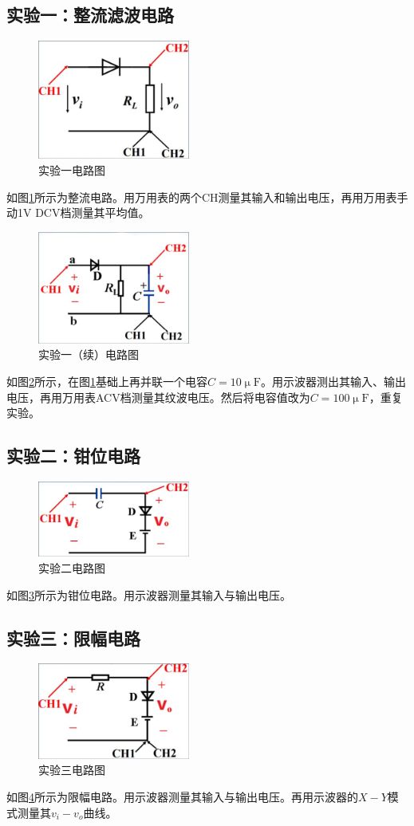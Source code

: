 \documentclass[a4paper,11pt,UTF8]{ctexart}
\begin{document}
	\subsection{实验一：整流滤波电路}
	\begin{figure}[H]
		\centering
		\includegraphics[width=5cm]{exp06.png}
		\caption{实验一电路图}
		\label{fig:Exp1}
	\end{figure}
	如图\ref{fig:Exp1}所示为整流电路。用万用表的两个CH测量其输入和输出电压，再用万用表手动1V DCV档测量其平均值。
	\begin{figure}[H]
		\centering
		\includegraphics[width=5cm]{exp07.png}
		\caption{实验一（续）电路图}
		\label{fig:Exp1Con}
	\end{figure}
	如图\ref{fig:Exp1Con}所示，在图\ref{fig:Exp1}基础上再并联一个电容$C=10\mathrm{\upmu F}$。用示波器测出其输入、输出电压，再用万用表ACV档测量其纹波电压。然后将电容值改为$C=100\mathrm{\upmu F}$，重复实验。
	\subsection{实验二：钳位电路}
	\begin{figure}[H]
		\centering
		\includegraphics[width=5cm]{exp08.png}
		\caption{实验二电路图}
		\label{fig:Exp2}
	\end{figure}
	如图\ref{fig:Exp2}所示为钳位电路。用示波器测量其输入与输出电压。
	\subsection{实验三：限幅电路}
	\begin{figure}[H]
		\centering
		\includegraphics[width=5cm]{exp09.png}
		\caption{实验三电路图}
		\label{fig:Exp3}
	\end{figure}
	如图\ref{fig:Exp3}所示为限幅电路。用示波器测量其输入与输出电压。再用示波器的$X - Y$模式测量其$v_i - v_o$曲线。
\end{document}
